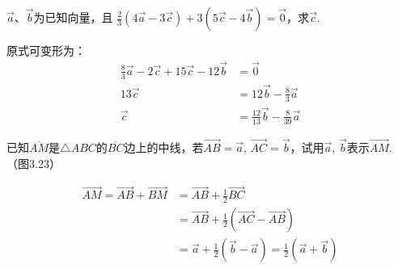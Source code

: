 \begin{example}
$\vec{a}$、$\vec{b}$为已知向量，且
$\frac{2}{3}\left(4\vec{a}-3\vec{c}\right)+3\left(5\vec{c}-4\vec{b}\right)=\vec{0}$，求$\vec{c}$.
\end{example}

\begin{solution}
原式可变形为：
\[\begin{split}
    \frac{8}{3}\vec{a}-2\vec{c}+15\vec{c}-12\vec{b}&=\vec{0}\\
    13\vec{c}&=12\vec{b}-\frac{8}{3}\vec{a}\\
    \vec{c}&=\frac{12}{13}\vec{b}-\frac{8}{39}\vec{a}
\end{split}\]
\end{solution}

\begin{example}
已知$\overline{AM}$是$\triangle ABC$的$\overline{BC}$边上的中线，若$\Vec{AB}=\vec{a}$, $\Vec{AC}=\vec{b}$，试用$\vec{a}$, $\vec{b}$表示$\Vec{AM}$. （图3.23）
\end{example}

\begin{figure}[htp]
    \centering
{}
    \caption{}
\end{figure}

\begin{solution}
\[\begin{split}
    \Vec{AM}=\Vec{AB}+\Vec{BM}&=\Vec{AB}+\frac{1}{2}\Vec{BC}\\
&=\Vec{AB}+\frac{1}{2}\left(\Vec{AC}-\Vec{AB}\right)\\
&=\vec{a}+\frac{1}{2}\left(\vec{b}-\vec{a}\right)=\frac{1}{2}\left(\vec{a}+\vec{b}\right)
\end{split}\]
\end{solution}

